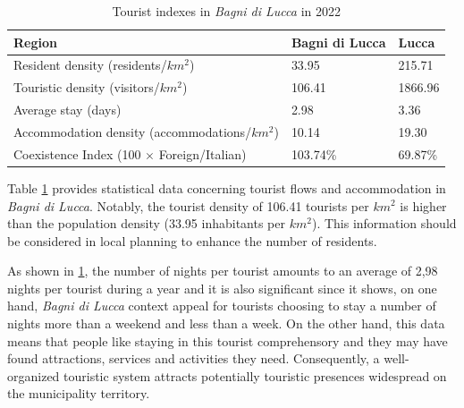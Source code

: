 \documentclass[sustainability,article,submit,pdftex,moreauthors]{Definitions/mdpi}
\begin{document}
\begin{table}
    \footnotesize
    \centering
    \begin{tabular}{l||l|l} \hline 
        {\bf Region} & {\bf Bagni di Lucca} & {\bf Lucca} \\ \hline
        Resident density (residents/{$km^2$}) & 33.95 & 215.71 \\
        Touristic density (visitors/{$km^2$}) & 106.41 & 1866.96 \\
        Average stay  (days) &  2.98 &  3.36 \\
        Accommodation density (accommodations/{$km^2$}) & 10.14 & 19.30 \\
        Coexistence Index (100 $\times$ Foreign/Italian) & 103.74\% &  69.87\% \\ 
         \hline
    \end{tabular}
    \caption{Tourist indexes in \emph{Bagni di Lucca} in 2022}
    \label{tab:tourism}
\end{table}

Table \ref{tab:tourism} provides statistical data concerning tourist flows and accommodation in \emph{Bagni di Lucca}. Notably, the tourist density of 106.41 tourists per $km^2$ is higher than the population density (33.95 inhabitants per $km^2$). This information should be considered in local planning to enhance the number of residents.

As shown in \ref{tab:tourism}, the number of nights per tourist amounts to an average of 2,98 nights per tourist during a year and it is also significant since it shows, on one hand, \emph{Bagni di Lucca} context appeal for tourists choosing to stay a number of nights more than a weekend and less than a week. On the other hand, this data means that people like staying in this tourist comprehensory and they may have found attractions, services and activities they need. Consequently, a well-organized touristic system attracts potentially touristic presences widespread on the municipality territory.
\end{document}
